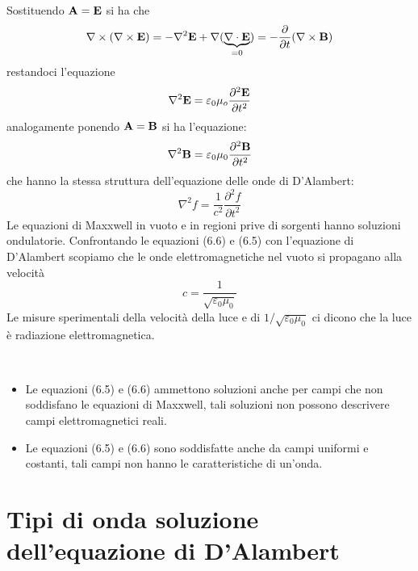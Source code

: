 Sostituendo $\bold{A} = \bold{E}$ si ha che 
\begin{equation*}
	\nabla \times (\nabla \times \bold{E}) = - \nabla^2 \bold{E} + \nabla (\underbrace{\nabla \cdot \bold{E}}_{=0}) = - \frac{\partial }{\partial t}(\nabla \times \bold{B})
\end{equation*}
restandoci l'equazione
\begin{equation}
	\nabla^2 \bold{E} = \varepsilon_0 \mu_o\frac{\partial^2 \bold{E}}{\partial t^2}
\end{equation}
analogamente ponendo $\bold{A} = \bold{B}$ si ha l'equazione:
\begin{equation}
	\nabla^2 \bold{B} = \varepsilon_0 \mu_0 \frac{\partial^2 \bold{B}}{\partial t^2}
\end{equation}
che hanno la stessa struttura dell'equazione delle onde di D'Alambert:
\begin{equation*}
	\nabla^2f = \frac{1}{c^2} \frac{\partial ^2f}{\partial t^2}
\end{equation*}
Le equazioni di Maxxwell in vuoto e in regioni prive di sorgenti hanno soluzioni ondulatorie. Confrontando le equazioni (6.6) e (6.5) con l'equazione di D'Alambert scopiamo che le onde elettromagnetiche nel vuoto si propagano alla velocit\`a 
\begin{equation*}
	c = \frac{1}{\sqrt{\varepsilon_0 \mu_0}}
\end{equation*}
Le misure sperimentali della velocit\`a della luce e di $1/\sqrt{\varepsilon_0 \mu_0}$ ci dicono che la luce \`e radiazione elettromagnetica.
\begin{remark}
\
\begin{itemize}
	\item Le equazioni (6.5) e (6.6)  ammettono soluzioni anche per campi che non soddisfano le equazioni di Maxxwell, tali soluzioni non possono descrivere campi elettromagnetici reali.
	\item Le equazioni (6.5) e (6.6) sono soddisfatte anche da campi uniformi e costanti, tali campi non hanno le caratteristiche di un'onda.
\end{itemize}	
\end{remark}
\section{Tipi di onda soluzione dell'equazione di D'Alambert}
